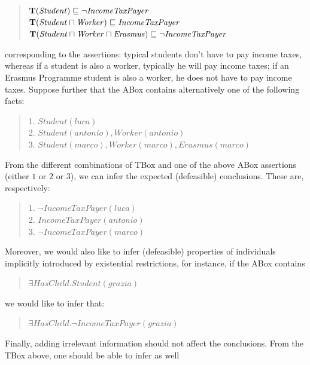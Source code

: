 \documentclass[a4paper, 11pt, oneside]{duthesis}
\newcommand{\tip}{{\bf T}}
\newcommand{\sqset}{\sqsubseteq}
\newcommand{\mint}{\sqcap}
\begin{document}
\begin{quote}
$\tip (\mathit{Student}) \sqset \mathit{\neg IncomeTaxPayer}$\\
$\tip (\mathit{Student} \mint \mathit{Worker})  \sqset \mathit{IncomeTaxPayer}$\\
$\tip (\mathit{Student} \mint \mathit{Worker} \mint \mathit{Erasmus})  \sqset \mathit{\neg IncomeTaxPayer}$
\end{quote}


\noindent corresponding to the assertions: typical students don't have to pay income taxes, whereas if a student is also a worker, typically he will pay income taxes; if an Erasmus Programme student is also a worker, he does not have to pay income taxes.
Suppose  further that the ABox contains alternatively one of the following facts:

\begin{quote}
1. $\mathit{Student}(\mathit{luca})$ \\
2. $\mathit{Student}(\mathit{antonio}), \mathit{Worker}(\mathit{antonio})$ \\
3. $\mathit{Student}(\mathit{marco}), \mathit{Worker}(\mathit{marco}), Erasmus(\mathit{marco})$
\end{quote}


\noindent From the different combinations of TBox and one of the above ABox assertions (either $1$ or $2$ or $3$), we can infer the expected (defeasible) conclusions. These are, respectively:

\begin{quote}
1. $\mathit{\neg IncomeTaxPayer}(\mathit{luca})$\\
2. $\mathit{IncomeTaxPayer}(\mathit{antonio})$ \\
3. $\mathit{\neg IncomeTaxPayer}(\mathit{marco})$
\end{quote}

\noindent Moreover, we would also like to infer (defeasible) properties of individuals implicitly introduced by existential restrictions, for instance, if the ABox contains

\begin{quote}
$\exists \mathit{HasChild}.\mathit{Student(grazia)}$
\end{quote}

\noindent we would like to infer that:
\begin{quote}
$\exists \mathit{HasChild.\neg IncomeTaxPayer(grazia)}$
\end{quote}

\noindent Finally, adding irrelevant information should not affect the conclusions. From the TBox above, one should be able to infer as well
\end{document}
